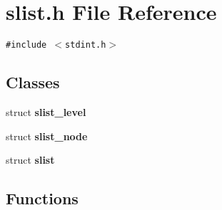 \section{slist.h File Reference}
\label{slist_8h}
{\tt \#include $<$stdint.h$>$}\par
\subsection*{Classes}
\begin{CompactItemize}
\item 
struct {\bf slist\_\-level}
\item 
struct {\bf slist\_\-node}
\item 
struct {\bf slist}
\end{CompactItemize}
\subsection*{Functions}
